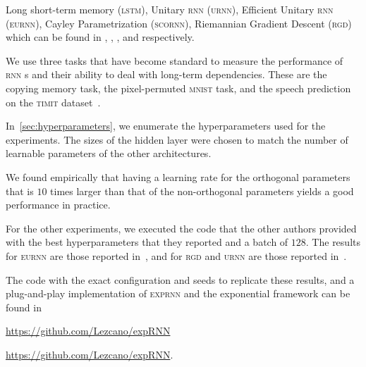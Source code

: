\else Long short-term memory (\textsc{lstm}), Unitary \textsc{rnn} (\textsc{urnn}), Efficient Unitary \textsc{rnn} (\textsc{eurnn}), Cayley Parametrization (\textsc{scornn}), Riemannian Gradient Descent (\textsc{rgd}) which can be found in \cite{hochreiter1997long}, \cite{arjovsky2016unitary}, \cite{jing2017tunable}, \cite{helfrich18a} and \cite{wisdom2016full} respectively.
\fi

We use three tasks that have become standard to measure the performance of \textsc{rnn} s and their ability to deal with long-term dependencies. These are the copying memory task, the pixel-permuted \textsc{mnist} task, and the speech prediction on the \textsc{timit} dataset~\cite{arjovsky2016unitary,wisdom2016full,henaff2016recurrent,mhammedi2017efficient,helfrich18a}.

In~\ref{sec:hyperparameters}, we enumerate the hyperparameters used for the experiments. The sizes of the hidden layer were chosen to match the number of learnable parameters of the other architectures.

\begin{remark}
    We found empirically that having a learning rate for the orthogonal parameters that is $10$ times larger than that of the non-orthogonal parameters yields a good performance in practice.
\end{remark}

For the other experiments, we executed the code that the other authors provided with the best hyperparameters that they reported and a batch of $128$. The results for \textsc{eurnn} are those reported in~\cite{jing2017tunable}, and for \textsc{rgd} and \textsc{urnn} are those reported in~\cite{helfrich18a}.

The code with the exact configuration and seeds to replicate these results, and a plug-and-play implementation of \textsc{exprnn} and the exponential framework can be found in \ifdefined\isgithub

\begin{center}
\url{https://github.com/Lezcano/expRNN}
\end{center}

\else
\url{https://github.com/Lezcano/expRNN}.
\fi

